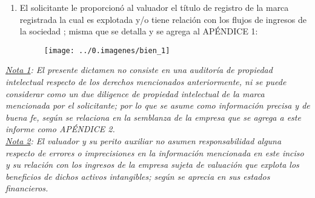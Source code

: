 \begin{enumerate}[\thesection.1.]
\item El solicitante le proporcion\'o al valuador el t\'itulo de registro de la marca registrada \textcolor{principal}{\marca{}} la cual es explotada y/o tiene relaci\'on con los flujos de ingresos de la sociedad \textcolor{principal}{\empresaSolicitante}; misma que se detalla y se agrega al \textcolor{terciario}{AP\'ENDICE 1:}

\begin{figure}[H]
\centering
\texttt{[image: ../0.imagenes/bien\_1]}\\
\end{figure}

\end{enumerate}

\textit{\underline{Nota 1}: El presente dictamen no consiste en una auditor\'ia de propiedad intelectual respecto de los derechos mencionados anteriormente, ni se puede considerar como un due diligence de propiedad intelectual de la marca mencionada por el solicitante; por lo que se asume como informaci\'on precisa y de buena fe, seg\'un se relaciona en la semblanza de la empresa que se agrega a este informe como \textcolor{terciario}{AP\'ENDICE 2.}}\\

\textit{\underline{Nota 2}: El valuador y su perito auxiliar no asumen responsabilidad alguna respecto de errores o imprecisiones en la informaci\'on mencionada en este inciso y su relaci\'on con los ingresos de la empresa sujeta de valuaci\'on que explota los beneficios de dichos activos intangibles; seg\'un se aprecia en sus estados financieros.}